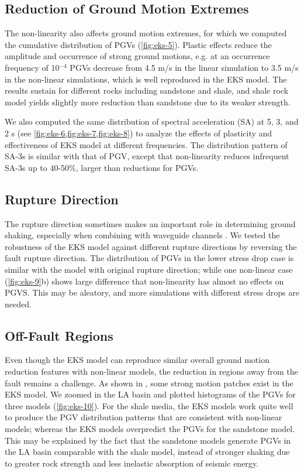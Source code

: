 \subsection{Reduction of Ground Motion Extremes}
The non-linearity also affects ground motion extremes, for which we computed the cumulative distribution of PGVs (\cref{fig:eks-5}). Plastic effects reduce the amplitude and occurrence of strong ground motions, e.g. at an occurrence frequency of 10$^{-4}$ PGVs decrease from 4.5 m/s in the linear simulation to 3.5 m/s in the non-linear simulations, which is well reproduced in the EKS model. The results sustain for different rocks including sandstone and shale, and shale rock model yields slightly more reduction than sandstone due to its weaker strength.

We also computed the same distribution of spectral acceleration (SA) at 5, 3, and 2 s (see \cref{fig:eks-6,fig:eks-7,fig:eks-8}) to analyze the effects of plasticity and effectiveness of EKS model at different frequencies. The distribution pattern of SA-3s is similar with that of PGV, except that non-linearity reduces infrequent SA-3s up to 40-50\%, larger than reductions for PGVs.

\subsection{Rupture Direction}
The rupture direction sometimes makes an important role in determining ground shaking, especially when combining with waveguide channels . We tested the robustness of the EKS model against different rupture directions by reversing the fault rupture direction. The distribution of PGVs in the lower stress drop case is similar with the model with original rupture direction; while one non-linear case (\cref{fig:eks-9}b) shows large difference that non-linearity has almost no effects on PGVS. This may be aleatory, and more simulations with different stress drops are needed.

\subsection{Off-Fault Regions}

Even though the EKS model can reproduce similar overall ground motion reduction features with non-linear models, the reduction in regions away from the fault remains a challenge. As shown in , some strong motion patches exist in the EKS model. We zoomed in the LA basin and plotted histograms of the PGVs for three models (\cref{fig:eks-10}). For the shale media, the EKS models work quite well to produce the PGV distribution patterns that are consistent with non-linear models; whereas the EKS models overpredict the PGVs for the sandstone model. This may be explained by the fact that the sandstone models generate PGVs in the LA basin comparable with the shale model, instead of stronger shaking due to greater rock strength and less inelastic absorption of seismic energy.


